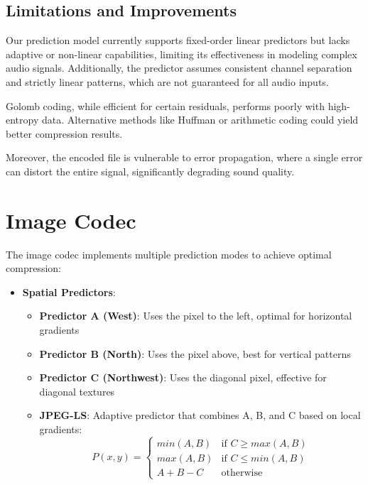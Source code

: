 \documentclass[a4paper,14pt]{article}
\begin{document}
\subsection{Limitations and Improvements}
Our prediction model currently supports fixed-order linear predictors but lacks adaptive or non-linear capabilities, limiting its effectiveness in modeling complex audio signals. Additionally, the predictor assumes consistent channel separation and strictly linear patterns, which are not guaranteed for all audio inputs.

Golomb coding, while efficient for certain residuals, performs poorly with high-entropy data. Alternative methods like Huffman or arithmetic coding could yield better compression results.

Moreover, the encoded file is vulnerable to error propagation, where a single error can distort the entire signal, significantly degrading sound quality.


\section{Image Codec}
The image codec implements multiple prediction modes to achieve optimal compression:

\begin{itemize}
    \item \textbf{Spatial Predictors}:
    \begin{itemize}
        \item \textbf{Predictor A (West)}: Uses the pixel to the left, optimal for horizontal gradients
        \item \textbf{Predictor B (North)}: Uses the pixel above, best for vertical patterns
        \item \textbf{Predictor C (Northwest)}: Uses the diagonal pixel, effective for diagonal textures
        \item \textbf{JPEG-LS}: Adaptive predictor that combines A, B, and C based on local gradients:
        \begin{equation}
            P(x,y) = \begin{cases}
                min(A,B) & \text{if } C \geq max(A,B) \\
                max(A,B) & \text{if } C \leq min(A,B) \\
                A + B - C & \text{otherwise}
            \end{cases}
        \end{equation}
    \end{itemize}

  
\end{itemize}
\end{document}
